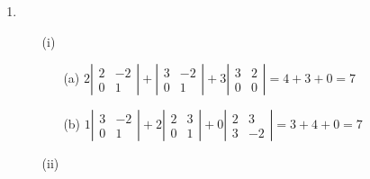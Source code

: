 \documentclass[12pt]{article}
\begin{document}
\noindent {\bf \ref{sec.det}:}
\begin{enumerate}
\item \begin{itemize} \item[(i)]
\begin{itemize}
\item[(a)] $2\left| \begin{array}{rr}2&-2\\0&1\end{array} \right| +
\left| \begin{array}{rr}3&-2\\0&1\end{array} \right| +
3 \left| \begin{array}{rr}3&2\\0&0\end{array} \right| = 4+3+0 = 7$
\item[(b)] $1\left| \begin{array}{rr}3&-2\\0&1\end{array} \right| +
2\left| \begin{array}{rr}2&3\\0&1\end{array} \right| +
0\left| \begin{array}{rr}2&3\\3&-2\end{array} \right| = 3+4+0 = 7$
\end{itemize}
\item[(ii)]
\end{itemize}
\end{enumerate}
\end{document}

